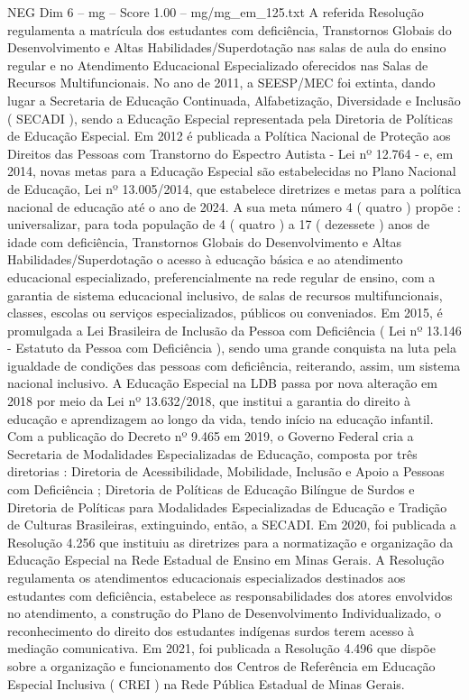\begin{textsample}{NEG Dim 6 – mg – Score 1.00 – mg/mg\_em\_125.txt}
A referida Resolução regulamenta a matrícula dos estudantes com deficiência, Transtornos Globais do Desenvolvimento e Altas Habilidades/Superdotação nas salas de aula do ensino regular e no Atendimento Educacional Especializado oferecidos nas Salas de Recursos Multifuncionais.
No ano de 2011, a SEESP/MEC foi extinta, dando lugar a Secretaria de Educação Continuada, Alfabetização, Diversidade e Inclusão ( SECADI ), sendo a Educação Especial representada pela Diretoria de Políticas de Educação Especial.
Em 2012 é publicada a Política Nacional de Proteção aos Direitos das Pessoas com Transtorno do Espectro Autista - Lei nº 12.764 - e, em 2014, novas metas para a Educação Especial são estabelecidas no Plano Nacional de Educação, Lei nº 13.005/2014, que estabelece diretrizes e metas para a política nacional de educação até o ano de 2024.
A sua meta número 4 ( quatro ) propõe : universalizar, para toda população de 4 ( quatro ) a 17 ( dezessete ) anos de idade com deficiência, Transtornos Globais do Desenvolvimento e Altas Habilidades/Superdotação o acesso à educação básica e ao atendimento educacional especializado, preferencialmente na rede regular de ensino, com a garantia de sistema educacional inclusivo, de salas de recursos multifuncionais, classes, escolas ou serviços especializados, públicos ou conveniados.
Em 2015, é promulgada a Lei Brasileira de Inclusão da Pessoa com Deficiência ( Lei nº 13.146 - Estatuto da Pessoa com Deficiência ), sendo uma grande conquista na luta pela igualdade de condições das pessoas com deficiência, reiterando, assim, um sistema nacional inclusivo.
A Educação Especial na LDB passa por nova alteração em 2018 por meio da Lei nº 13.632/2018, que institui a garantia do direito à educação e aprendizagem ao longo da vida, tendo início na educação infantil.
Com a publicação do Decreto nº 9.465 em 2019, o Governo Federal cria a Secretaria de Modalidades Especializadas de Educação, composta por três diretorias : Diretoria de Acessibilidade, Mobilidade, Inclusão e Apoio a Pessoas com Deficiência ; Diretoria de Políticas de Educação Bilíngue de Surdos e Diretoria de Políticas para Modalidades Especializadas de Educação e Tradição de Culturas Brasileiras, extinguindo, então, a SECADI.
Em 2020, foi publicada a Resolução 4.256 que instituiu as diretrizes para a normatização e organização da Educação Especial na Rede Estadual de Ensino em Minas Gerais.
A Resolução regulamenta os atendimentos educacionais especializados destinados aos estudantes com deficiência, estabelece as responsabilidades dos atores envolvidos no atendimento, a construção do Plano de Desenvolvimento Individualizado, o reconhecimento do direito dos estudantes indígenas surdos terem acesso à mediação comunicativa.
Em 2021, foi publicada a Resolução 4.496 que dispõe sobre a organização e funcionamento dos Centros de Referência em Educação Especial Inclusiva ( CREI ) na Rede Pública Estadual de Minas Gerais.

\end{textsample}
